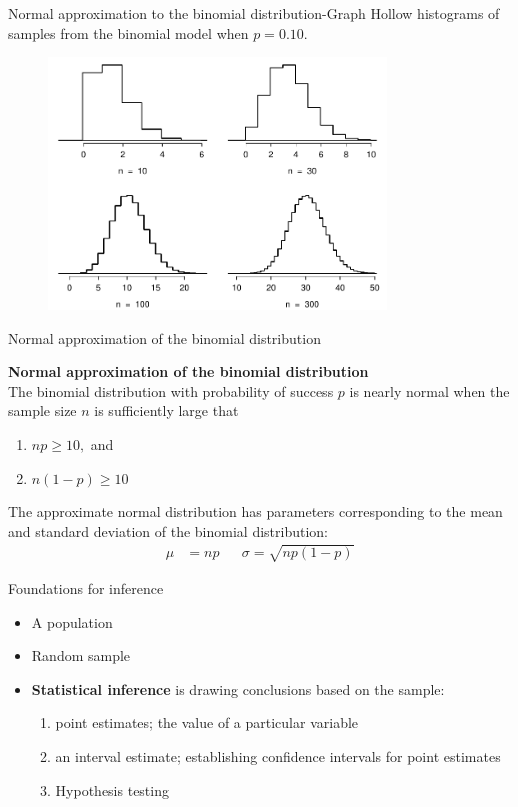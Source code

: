 \documentclass[12pt,a4paper]{beamer}
\begin{document}
\begin{frame}{Normal approximation to the binomial distribution-Graph}
	Hollow histograms of samples from the binomial model when $p=0.10$.
	\begin{figure}[h]
	\centering
	\includegraphics[width=0.8\textwidth]{figures/fourBinomialModelsShowingApproxToNormal/fourBinomialModelsShowingApproxToNormal}
	
	\end{figure}
\end{frame}
\begin{frame}{Normal approximation of the binomial distribution}
	\begin{framed}\textbf{Normal approximation of the binomial distribution}\\
The binomial distribution with probability of success $p$ is nearly normal when the sample size $n$ is sufficiently large that
\begin{enumerate}
	\item $np\geq 10,$ and
	\item $n(1-p)\geq 10$
	\end{enumerate} 
 The approximate normal distribution has parameters corresponding to the mean and standard deviation of the binomial distribution:\vspace{-1.5mm}
\begin{align*}
\mu &= np
&&\sigma= \sqrt{np(1-p)}
\end{align*}
\end{framed}
\end{frame}
\begin{frame}{Foundations for inference}
	\begin{itemize}
		\item A population
		\item Random sample
		\item \textbf{Statistical inference} is drawing conclusions based on the sample:
		\begin{enumerate}
			\item point estimates; the value of a particular variable
			\item an interval estimate; establishing confidence intervals for point estimates
			\item Hypothesis testing
		\end{enumerate} 
	\end{itemize}
\end{frame}
\end{document}
